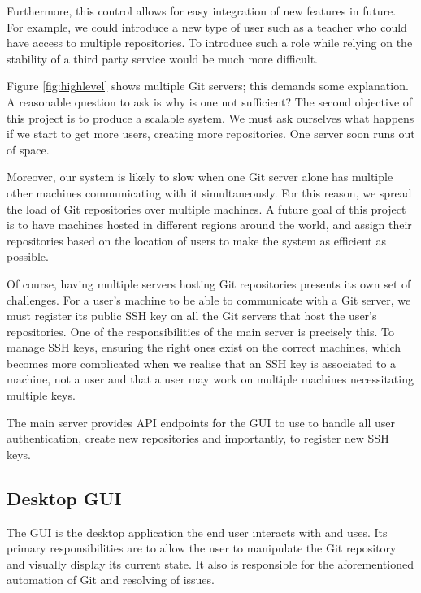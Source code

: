 Furthermore, this control allows for easy integration of new features in future. For example, we could introduce a new type of user such as a teacher who could have access to multiple repositories. To introduce such a role while relying on the stability of a third party service would be much more difficult.

Figure \ref{fig:highlevel} shows multiple Git servers; this demands some explanation. A reasonable question to ask is why is one not sufficient? The second objective of this project is to produce a scalable system. We must ask ourselves what happens if we start to get more users, creating more repositories. One server soon runs out of space. 

Moreover, our system is likely to slow when one Git server alone has multiple other machines communicating with it simultaneously. For this reason, we spread the load of Git repositories over multiple machines. A future goal of this project is to have machines hosted in different regions around the world, and assign their repositories based on the location of users to make the system as efficient as possible.

Of course, having multiple servers hosting Git repositories presents its own set of challenges. For a user's machine to be able to communicate with a Git server, we must register its public SSH key on all the Git servers that host the user's repositories. One of the responsibilities of the main server is precisely this. To manage SSH keys, ensuring the right ones exist on the correct machines, which becomes more complicated when we realise that an SSH key is associated to a machine, not a user and that a user may work on multiple machines necessitating multiple keys.

The main server provides API endpoints for the GUI to use to handle all user authentication, create new repositories and importantly, to register new SSH keys.

\subsection{Desktop GUI}

The GUI is the desktop application the end user interacts with and uses. Its primary responsibilities are to allow the user to manipulate the Git repository and visually display its current state. It also is responsible for the aforementioned automation of Git and resolving of issues.

